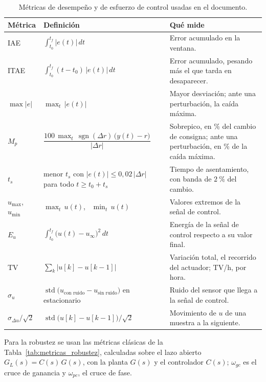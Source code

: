 \begin{table}[tbp]
\centering
\caption{Métricas de desempeño y de esfuerzo de control usadas en el documento.}
\label{tab:metricas}
\small
\renewcommand{\arraystretch}{1.0}
\begin{tabular}{@{}l>{\centering\arraybackslash}p{6.0cm}>{\raggedright\arraybackslash}p{7.0cm}@{}}
\toprule
\textbf{Métrica} & \textbf{Definición} & \textbf{Qué mide} \\
\midrule
IAE & $\displaystyle\int_{t_0}^{t_f} |e(t)|\,dt$ & Error acumulado en la ventana. \\
ITAE & $\displaystyle\int_{t_0}^{t_f} (t - t_0)\,|e(t)|\,dt$ & Error acumulado, pesando más el que tarda en desaparecer. \\
$\max|e|$ & $\max_t\,|e(t)|$ & Mayor desviación; ante una perturbación, la caída máxima. \\
$M_p$ & $\dfrac{100\,\max_t\,\operatorname{sgn}(\Delta r)\,\bigl(y(t) - r\bigr)}{|\Delta r|}$ & Sobrepico, en \% del cambio de consigna; ante una perturbación, en \% de la caída máxima. \\
$t_s$ & menor $t_s$ con $|e(t)| \le 0{,}02\,|\Delta r|$ para todo $t \ge t_0 + t_s$ & Tiempo de asentamiento, con banda de $2~\%$ del cambio. \\
\midrule
$u_{\max}$, $u_{\min}$ & $\max_t\,u(t)$, \ $\min_t\,u(t)$ & Valores extremos de la señal de control. \\
$E_u$ & $\displaystyle\int_{t_0}^{t_f} \bigl(u(t) - u_\infty\bigr)^2\,dt$ & Energía de la señal de control respecto a su valor final. \\
TV & $\displaystyle\sum_k \bigl|u[k] - u[k-1]\bigr|$ & Variación total, el recorrido del actuador; TV/h, por hora. \\
$\sigma_u$ & $\operatorname{std}\bigl(u_{\text{con ruido}} - u_{\text{sin ruido}}\bigr)$ en estacionario & Ruido del sensor que llega a la señal de control. \\
$\sigma_{\Delta u}/\sqrt{2}$ & $\operatorname{std}\bigl(u[k] - u[k-1]\bigr)/\sqrt{2}$ & Movimiento de $u$ de una muestra a la siguiente. \\
\bottomrule
\end{tabular}
\end{table}

Para la robustez se usan las métricas clásicas de la Tabla~\ref{tab:metricas_robustez}, calculadas
sobre el lazo abierto $G_L(s) = C(s)\,G(s)$, con la planta $G(s)$ y el controlador $C(s)$;
$\omega_{gc}$ es el cruce de ganancia y $\omega_{pc}$, el cruce de fase.


